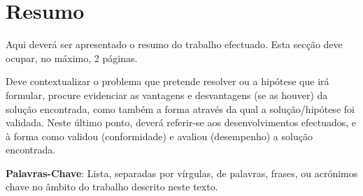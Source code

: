 \chapter*{Resumo}

Aqui deverá ser apresentado o resumo do trabalho efectuado. Esta secção deve ocupar, no máximo, 2 páginas.

Deve contextualizar o problema que pretende resolver ou a hipótese que irá formular, procure evidenciar as vantagens e desvantagens (se as houver) da solução encontrada, como também a forma através da qual a solução/hipótese foi validada. Neste último ponto, deverá referir-se aos desenvolvimentos efectuados, e à forma como validou (conformidade) e avaliou (desempenho) a solução encontrada.

\textbf{Palavras-Chave}: Lista, separadas por vírgulas, de palavras, frases, ou acrónimos chave no âmbito do trabalho descrito neste texto.

